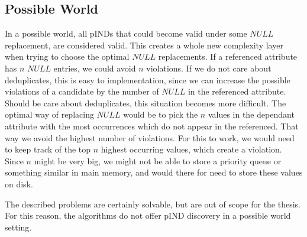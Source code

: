 \subsection*{Possible World}
In a possible world, all pINDs that could become valid under some $NULL$ replacement, are considered valid. This creates a whole new complexity layer when trying to choose the optimal $NULL$ replacements. If a referenced attribute has $n$ $NULL$ entries, we could avoid $n$ violations. If we do not care about deduplicates, this is easy to implementation, since we can increase the possible violations of a candidate by the number of $NULL$ in the referenced attribute. Should be care about deduplicates, this situation becomes more difficult. The optimal way of replacing $NULL$ would be to pick the $n$ values in the dependant attribute with the most occurrences which do not appear in the referenced. That way we avoid the highest number of violations. For this to work, we would need to keep track of the top $n$ highest occurring values, which create a violation. Since $n$ might be very big, we might not be able to store a priority queue or something similar in main memory, and would there for need to store these values on disk.

The described problems are certainly solvable, but are out of scope for the thesis. For this reason, the algorithms do not offer pIND discovery in a possible world setting.